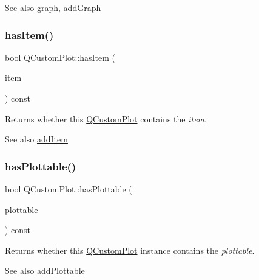 \begin{DoxySeeAlso}{See also}
\mbox{\hyperlink{class_q_custom_plot_a6ecae130f684b25276fb47bd3a5875c6}{graph}}, \mbox{\hyperlink{class_q_custom_plot_a6fb2873d35a8a8089842d81a70a54167}{add\+Graph}} 
\end{DoxySeeAlso}
\mbox{\label{class_q_custom_plot_af0b57f35646079f93fa6161a65b36109}} 
\subsubsection{\texorpdfstring{has\+Item()}{hasItem()}}
{\footnotesize\ttfamily bool Q\+Custom\+Plot\+::has\+Item (\begin{DoxyParamCaption}\item[{\mbox{\hyperlink{class_q_c_p_abstract_item}{Q\+C\+P\+Abstract\+Item}} $\ast$}]{item }\end{DoxyParamCaption}) const}

Returns whether this \mbox{\hyperlink{class_q_custom_plot}{Q\+Custom\+Plot}} contains the {\itshape item}.

\begin{DoxySeeAlso}{See also}
\mbox{\hyperlink{class_q_custom_plot_aa500620379262321685cb7a7674cbd2a}{add\+Item}} 
\end{DoxySeeAlso}
\mbox{\label{class_q_custom_plot_a72cefbfbb9e699940e37be605bd9c51e}} 
\subsubsection{\texorpdfstring{has\+Plottable()}{hasPlottable()}}
{\footnotesize\ttfamily bool Q\+Custom\+Plot\+::has\+Plottable (\begin{DoxyParamCaption}\item[{\mbox{\hyperlink{class_q_c_p_abstract_plottable}{Q\+C\+P\+Abstract\+Plottable}} $\ast$}]{plottable }\end{DoxyParamCaption}) const}

Returns whether this \mbox{\hyperlink{class_q_custom_plot}{Q\+Custom\+Plot}} instance contains the {\itshape plottable}.

\begin{DoxySeeAlso}{See also}
\mbox{\hyperlink{class_q_custom_plot_ab7ad9174f701f9c6f64e378df77927a6}{add\+Plottable}} 
\end{DoxySeeAlso}
\mbox{\label{class_q_custom_plot_ac042f2e78edd228ccf2f26b7fe215239}} 
